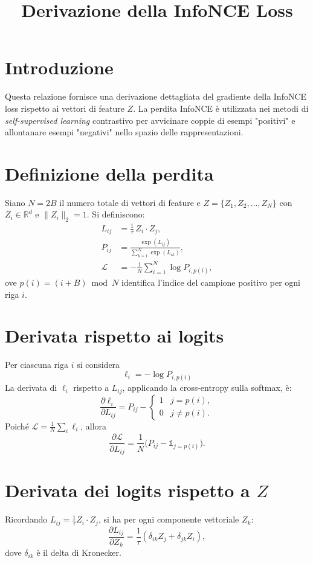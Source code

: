 \documentclass[a4paper,11pt]{article}
\title{Derivazione della InfoNCE Loss}
\author{}
\date{}
\begin{document}
\maketitle

\section*{Introduzione}
Questa relazione fornisce una derivazione dettagliata del gradiente della InfoNCE loss rispetto ai vettori di feature $Z$. La perdita InfoNCE è utilizzata nei metodi di \emph{self-supervised learning} contrastivo per avvicinare coppie di esempi "positivi" e allontanare esempi "negativi" nello spazio delle rappresentazioni.

\section{Definizione della perdita}
Siano $N=2B$ il numero totale di vettori di feature e $Z=\{Z_1, Z_2, \dots, Z_N\}$ con $Z_i\in\mathbb{R}^d$ e $\|Z_i\|_2=1$. Si definiscono:
\begin{align*}
L_{ij} &= \frac{1}{\tau} \, Z_i \cdot Z_j, \\
P_{ij} &= \frac{\exp(L_{ij})}{\sum_{k=1}^{N} \exp(L_{ik})}, \\
\mathcal{L} &= -\frac{1}{N} \sum_{i=1}^{N} \log P_{i, p(i)},
\end{align*}
ove $p(i)=(i+B)\bmod N$ identifica l'indice del campione positivo per ogni riga $i$.

\section{Derivata rispetto ai logits}
Per ciascuna riga $i$ si considera
\[
\ell_i = -\log P_{i,p(i)}
\]
La derivata di $\ell_i$ rispetto a $L_{ij}$, applicando la cross-entropy sulla softmax, è:
\[
\frac{\partial \ell_i}{\partial L_{ij}} = P_{ij} - \begin{cases}1 & j = p(i), \\ 0 & j \neq p(i).\end{cases}
\]
Poiché $\mathcal{L}=\frac{1}{N}\sum_i \ell_i$, allora
\[
\frac{\partial \mathcal{L}}{\partial L_{ij}} = \frac{1}{N}\bigl(P_{ij} - \mathbb{1}_{j=p(i)}\bigr).
\]

\section{Derivata dei logits rispetto a $Z$}
Ricordando $L_{ij}=\tfrac{1}{\tau} Z_i \cdot Z_j$, si ha per ogni componente vettoriale $Z_k$:
\[
\frac{\partial L_{ij}}{\partial Z_k} = \frac{1}{\tau}(\delta_{ik} Z_j + \delta_{jk} Z_i),
\]
dove $\delta_{ik}$ è il delta di Kronecker.
\end{document}
